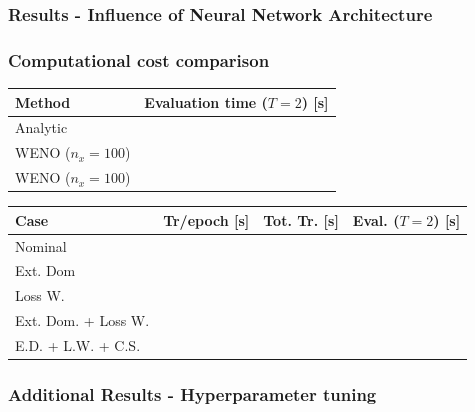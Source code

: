 \documentclass[aspectratio=169]{beamer}
\begin{document}
\begin{frame}\frametitle{Results - Influence of Neural Network Architecture}
	
	
\end{frame}

\begin{frame}\frametitle{Computational cost comparison}
	
	\begin{table}
		\centering
		\begin{tabular}{lc}
			\hline
			Method					& Evaluation time ($T=2$) [s] \\
			\hline
			Analytic				& 			\\
			WENO ($n_x = 100$)		&			\\
			WENO ($n_x = 100$)		& 			\\
			\hline						
		\end{tabular}				
	\end{table}

	
	\begin{table}
		\centering
		\begin{tabular}{lccc}
			\hline
			Case					& Tr/epoch [s] & Tot. Tr. [s] & Eval. ($T=2$) [s] \\
			\hline
			Nominal				&  &  & 			\\
			Ext. Dom		&  &  &			\\
			Loss W.		&  &  & 			\\
			Ext. Dom. + Loss W.		&  &  & 			\\
			E.D. + L.W. + C.S.		&  &  & 			\\
			\hline						
		\end{tabular}				
	\end{table}

	
\end{frame}

\begin{frame}\frametitle{Additional Results - Hyperparameter tuning}
	
	
\end{frame}
\end{document}
